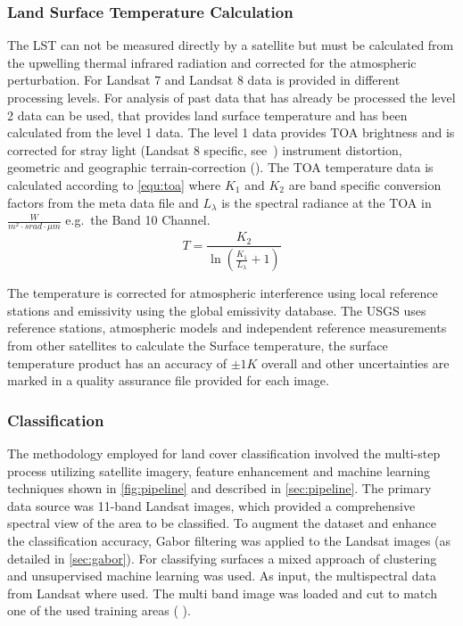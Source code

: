 \documentclass[12pt,a4paper, english,twoside]{article}
\begin{document}
	\subsubsection{Land Surface Temperature Calculation}\label{sec:lstcalc}
    The \gls{LST} can not be measured directly by a satellite but must be calculated from the upwelling thermal infrared radiation and corrected for the atmospheric perturbation. 
    For Landsat 7 and Landsat 8 data is provided in different processing levels.
    For analysis of past data that has already be processed the level 2 data can be used, that provides land surface temperature and has been calculated from the level 1 data. 
    The level 1 data provides \gls{TOA} brightness and is corrected for stray light (Landsat 8 specific, see~\cite[p.~67]{Zanter2019}) instrument distortion, geometric and geographic terrain-correction (\cite[p.~44]{Zanter2019}).
    The \gls{TOA} temperature data is calculated according to \cref{equ:toa} where $K_1$ and $K_2$ are band specific conversion factors from the meta data file and $L_\lambda$ is the spectral radiance at the TOA in $\frac{W}{m^2\cdot srad \cdot \mu m}$ e.g.\ the Band 10 Channel. 
    \begin{equation}\label{equ:toa}
	    T = \frac{K_2}{\ln\left(\frac{K_1}{L_{\lambda}}+1\right)}
    \end{equation}
 
    The temperature is corrected for atmospheric interference using local reference stations and emissivity using the global emissivity database.  %
    The USGS uses reference stations, atmospheric models and independent reference measurements from other satellites to calculate the Surface temperature, the surface temperature product has an accuracy of $\pm 1 K$ overall and other uncertainties are marked in a quality assurance file provided for each image.
    \subsubsection{Classification }\label{sec:classification}
    The methodology employed for land cover classification involved the multi-step process utilizing satellite imagery, feature enhancement and machine learning techniques shown in \cref{fig:pipeline} and described in \cref{sec:pipeline}.
    The primary data source was 11-band Landsat images, which provided a comprehensive spectral view of the area to be classified.
    To augment the dataset and enhance the classification accuracy, Gabor filtering was applied to the Landsat images (as detailed in \cref{sec:gabor}).
    For classifying surfaces a mixed approach of clustering and unsupervised machine learning was used. 
    As input, the multispectral data from Landsat where used.
    The multi band image was loaded and cut to match one of the used training areas (%
). 
\end{document}
